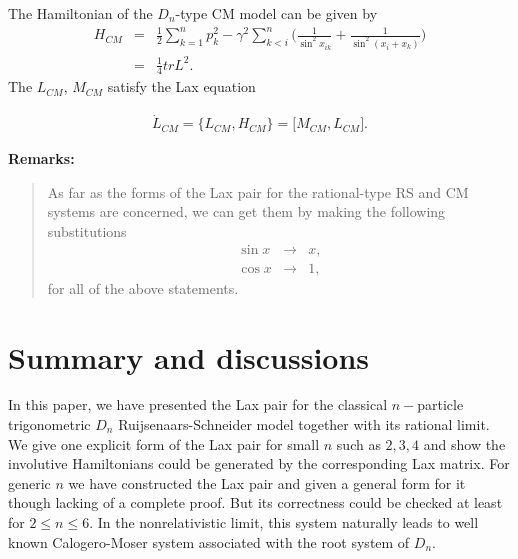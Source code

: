 \documentclass[a4paper,12pt]{article}
\begin{document}
The Hamiltonian of the $D_{n}$-type CM model can be given by
\begin{eqnarray}
H_{CM} &=&\frac{1}{2}\sum_{k=1}^{n}p_{k}^{2}-\gamma ^{2}\sum_{k<i}^{n}\Big(%
\frac{1}{\sin ^{2}x_{ik}}+\frac{1}{\sin ^{2}(x_{i}+x_{k})}\Big)  \nonumber \\
&=&\frac{1}{4}trL^{2}.
\end{eqnarray}
The $L_{CM}$, $M_{CM}$ satisfy the Lax equation

\begin{eqnarray}
\dot{L}_{CM}=\{L_{CM},H_{CM}\}=\lbrack M_{CM},L_{CM}\rbrack.
\end{eqnarray}

\noindent

\textbf{Remarks:}

\begin{quotation}
As far as the forms of the Lax pair for the rational-type RS and CM systems
are concerned, we can get them by making the following substitutions
\begin{eqnarray}
\sin x &\rightarrow &x,  \nonumber \\
\cos x &\rightarrow &1,
\end{eqnarray}
for all of the above statements.
\end{quotation}

\section{Summary and discussions}

\label{sum}

In this paper, we have presented the Lax pair for the classical $n-$particle
trigonometric $D_{n}$ Ruijsenaars-Schneider model together with its rational
limit. We give one explicit form of the Lax pair for small $n$ such as $2,3,4
$ and show the involutive Hamiltonians could be generated by the
corresponding Lax matrix. For generic $n$ we have constructed the Lax pair
and given a general form for it though lacking of a complete proof. But its
correctness could be checked at least for $2\leq n\leq 6$. In the
nonrelativistic limit, this system naturally leads to well known
Calogero-Moser system associated with the root system of $D_{n}$.
\end{document}
